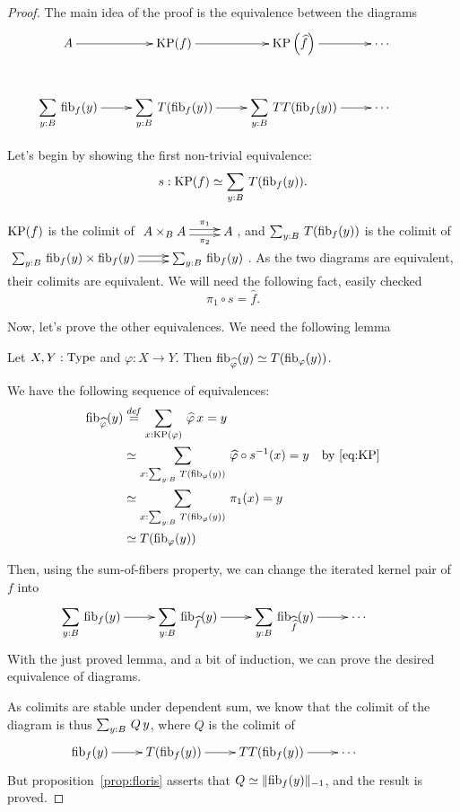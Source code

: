 \begin{proof}
  The main idea of the proof is the equivalence between the diagrams
\[
\xymatrix{
  A \ar[r] & \KP(f) \ar[r] & \KP\left(\widehat f\right) \ar[r]&
  \cdots & \\
  \displaystyle{\sumD y B {\fib f y}} \ar[r] & \displaystyle{\sumD y B {T(\fib f y)}} \ar[r]& \displaystyle{\sumD
  y B {TT(\fib f y)}} \ar[r]&  \cdots &
}
\]

Let's begin by showing the first non-trivial equivalence: 
\begin{equation}
  \label{eq:KP}
  s: \operatorname{KP}(f) \simeq \sum_{y:B}\, T(\mathrm{fib}_{f}(y)).  
\end{equation}

$\operatorname{KP}(f)$ is the colimit of $\xymatrix{ A\times_B A \ar@<-.5ex>[r]_-{\pi_2}
  \ar@<.5ex>[r]^-{\pi_1} & A }$, and $\sum_{y:B}\, T(\mathrm{fib}_{f}(y))$ is
the colimit of $\xymatrix{ \sumD y B {\fib f y \times \fib f y} \ar@<-.5ex>[r]
  \ar@<.5ex>[r] & \sumD y B {\fib f y} }$.
As the two diagrams are equivalent, their colimits are equivalent. We
will need the following fact, easily checked
\[ \pi_1 \circ s = \widehat f.\]

Now, let's prove the other equivalences. We need the following lemma
\begin{lem}
  Let $X,Y:\operatorname{Type}$ and $\varphi:X\to Y$. Then $\mathrm{fib}_{\widehat\varphi}(y)
  \simeq T(\mathrm{fib}_{\varphi}(y))$.
\end{lem}
\begin{prooflem}
  We have the following sequence of equivalences:
  \begin{align*}
    \mathrm{fib}_{\widehat\varphi}(y) 
    &\overset{de\hspace{-0.2ex}f}{=} \sum_{x:\operatorname{KP}(\varphi)}\, \widehat \varphi\, x = y \\
    &\simeq \sum_{x:\sum_{y:B}\, T(\mathrm{fib}_{\varphi}(y))}\, \widehat \varphi \circ s^{-1}
      (x) = y \quad\text{by \ref{eq:KP}} \\
    &\simeq\sum_{x:\sum_{y:B}\, T(\mathrm{fib}_{\varphi}(y))}\, \pi_1(x) = y \\
    &\simeq T(\mathrm{fib}_{\varphi}(y))
  \end{align*}
\end{prooflem}
Then, using the sum-of-fibers property, we can change the iterated
kernel pair of $f$ into
\[
\xymatrix{
\displaystyle{\sumD y B {\fib f y}} \ar[r] & \displaystyle{\sumD y B
  {\fib{\widehat f}y}} \ar[r]& \displaystyle{\sumD
  y B {\fib{\widehat{\widehat f}} y}} \ar[r]&  \cdots &
}
\]
With the just proved lemma, and a bit of induction, we can prove the
desired equivalence of diagrams.

As colimits are stable under dependent sum, we know that the colimit
of the diagram is thus $\sum_{y:B}\, Q\, y$, where $Q$ is the colimit
of
\[\xymatrix{\displaystyle{{\fib f y}} \ar[r] & \displaystyle{{T(\fib f
        y)}} \ar[r]& \displaystyle{{TT(\fib f y)}} \ar[r]&  \cdots
    &}\]
But proposition~\ref{prop:floris} asserts that $Q \simeq \|\mathrm{fib}_{f}(y)\|_{-1}$, and the result is proved.
\end{proof}

